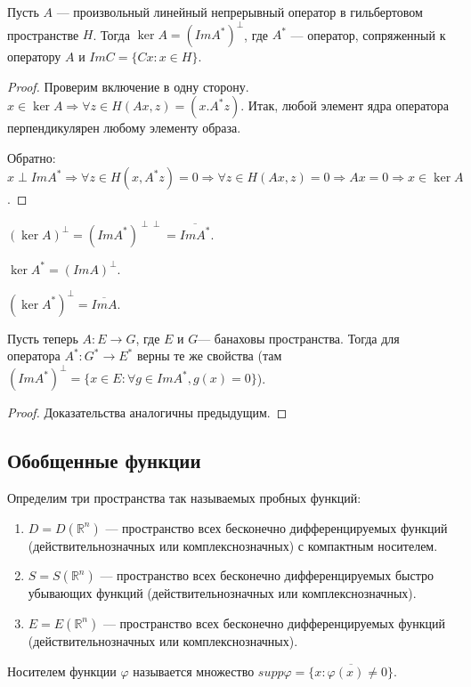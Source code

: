 \documentclass[10pt]{article}
\begin{document}
\begin{theorem}
  Пусть $A$ --- произвольный линейный непрерывный оператор
  в гильбертовом пространстве $H$. Тогда $\ker A=(Im A^*)^{\perp}$,
  где $A^*$ --- оператор, сопряженный к оператору $A$ и $Im C=\{Cx:
  x\in H\}$.
\end{theorem}

\begin{proof}
  Проверим включение в одну сторону. $x\in \ker A
  \Longrightarrow \forall z\in H (Ax,z)=(x.A^*z)$. Итак, любой
  элемент ядра оператора перпендикулярен любому элементу образа.

  Обратно: $x\perp ImA^*\Longrightarrow \forall z\in H (x,A^*z)=0
  \Longrightarrow \forall z\in H (Ax,z)=0 \Longrightarrow Ax=0
  \Longrightarrow x\in \ker A$.
\end{proof}

\begin{imp}
  $(\ker A)^{\perp}=(ImA^*)^{\perp\perp}=\overline{ImA^*}$.
\end{imp}

\begin{imp}
  $\ker A^*=(ImA)^{\perp}$.
\end{imp}

\begin{imp}
  $(\ker A^*)^{\perp}=\overline{ImA}$.
\end{imp}

\begin{theorem}
  Пусть теперь $A\colon E\longrightarrow G$, где $E$ и $G$---
  банаховы пространства. Тогда для оператора $A^*\colon
  G^*\longrightarrow E^*$ верны те же свойства (там $(Im
  A^*)^{\perp}=\{x\in E:\forall g\in Im A^*, g(x)=0\}$).
\end{theorem}

\begin{proof}
  Доказательства аналогичны предыдущим.
\end{proof}

\subsection{Обобщенные функции}


Определим три пространства так называемых пробных функций:
\begin{enumerate}

\item $D=D(\mathbb{R}^n)$ --- пространство всех бесконечно
  дифференцируемых функций (действительнозначных или комплекснозначных)
  с компактным носителем.

\item $S=S(\mathbb{R}^n)$ --- пространство всех бесконечно
  дифференцируемых быстро убывающих функций (действительнозначных
  или комплекснозначных).

\item $E=E(\mathbb{R}^n)$ --- пространство всех бесконечно
  дифференцируемых функций (действительнозначных или
  комплекснозначных).
\end{enumerate}
\begin{df}
  Носителем функции $\varphi$ называется множество
  $supp\varphi=\overline{\{x: \varphi(x)\neq0\}}$.
\end{df}
\end{document}
